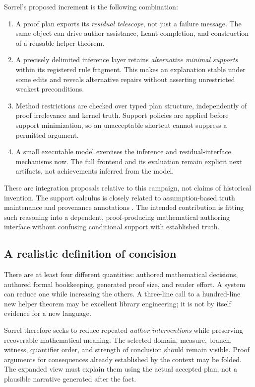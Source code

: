 \documentclass[11pt,a4paper]{article}
\numberwithin{equation}{section}
\theoremstyle{definition}\newtheorem{definition}[theorem]{Definition}
\theoremstyle{remark}\newtheorem{remark}[theorem]{Remark}
\begin{document}
Sorrel's proposed increment is the following combination:
\begin{enumerate}
\item A proof plan exports its \emph{residual telescope}, not just a failure
message. The same object can drive author assistance, Leant completion, and
construction of a reusable helper theorem.
\item A precisely delimited inference layer retains \emph{alternative minimal
supports} within its registered rule fragment. This makes an explanation
stable under some edits and reveals alternative repairs without asserting
unrestricted weakest preconditions.
\item Method restrictions are checked over typed plan structure, independently
of proof irrelevance and kernel truth. Support policies are applied before
support minimization, so an unacceptable shortcut cannot suppress a permitted
argument.
\item A small executable model exercises the inference and residual-interface
mechanisms now. The full frontend and its evaluation remain explicit next
artifacts, not achievements inferred from the model.
\end{enumerate}

These are integration proposals relative to this campaign, not claims of
historical invention. The support calculus is closely related to
assumption-based truth maintenance and provenance annotations
\cite{dekleer,provenance}. The intended contribution is fitting such reasoning
into a dependent, proof-producing mathematical authoring interface without
confusing conditional support with established truth.

\subsection{A realistic definition of concision}
There are at least four different quantities: authored mathematical decisions,
authored formal bookkeeping, generated proof size, and reader effort. A system
can reduce one while increasing the others. A three-line call to a hundred-line
new helper theorem may be excellent library engineering; it is not by itself
evidence for a new language.

Sorrel therefore seeks to reduce repeated \emph{author interventions} while
preserving recoverable mathematical meaning. The selected domain, measure,
branch, witness, quantifier order, and strength of conclusion should remain
visible. Proof arguments for consequences already established by the context
may be folded. The expanded view must explain them using the actual accepted
plan, not a plausible narrative generated after the fact.
\end{document}
